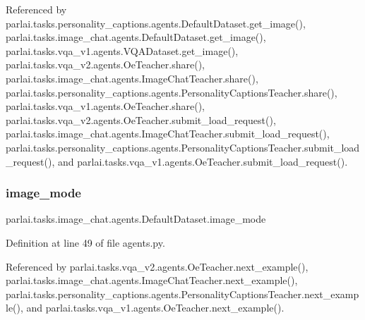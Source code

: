 Referenced by parlai.\+tasks.\+personality\+\_\+captions.\+agents.\+Default\+Dataset.\+get\+\_\+image(), parlai.\+tasks.\+image\+\_\+chat.\+agents.\+Default\+Dataset.\+get\+\_\+image(), parlai.\+tasks.\+vqa\+\_\+v1.\+agents.\+V\+Q\+A\+Dataset.\+get\+\_\+image(), parlai.\+tasks.\+vqa\+\_\+v2.\+agents.\+Oe\+Teacher.\+share(), parlai.\+tasks.\+image\+\_\+chat.\+agents.\+Image\+Chat\+Teacher.\+share(), parlai.\+tasks.\+personality\+\_\+captions.\+agents.\+Personality\+Captions\+Teacher.\+share(), parlai.\+tasks.\+vqa\+\_\+v1.\+agents.\+Oe\+Teacher.\+share(), parlai.\+tasks.\+vqa\+\_\+v2.\+agents.\+Oe\+Teacher.\+submit\+\_\+load\+\_\+request(), parlai.\+tasks.\+image\+\_\+chat.\+agents.\+Image\+Chat\+Teacher.\+submit\+\_\+load\+\_\+request(), parlai.\+tasks.\+personality\+\_\+captions.\+agents.\+Personality\+Captions\+Teacher.\+submit\+\_\+load\+\_\+request(), and parlai.\+tasks.\+vqa\+\_\+v1.\+agents.\+Oe\+Teacher.\+submit\+\_\+load\+\_\+request().

\mbox{\label{classparlai_1_1tasks_1_1image__chat_1_1agents_1_1DefaultDataset_ae429b8f3c79618de545845c21e098e63}} 
\subsubsection{\texorpdfstring{image\+\_\+mode}{image\_mode}}
{\footnotesize\ttfamily parlai.\+tasks.\+image\+\_\+chat.\+agents.\+Default\+Dataset.\+image\+\_\+mode}



Definition at line 49 of file agents.\+py.



Referenced by parlai.\+tasks.\+vqa\+\_\+v2.\+agents.\+Oe\+Teacher.\+next\+\_\+example(), parlai.\+tasks.\+image\+\_\+chat.\+agents.\+Image\+Chat\+Teacher.\+next\+\_\+example(), parlai.\+tasks.\+personality\+\_\+captions.\+agents.\+Personality\+Captions\+Teacher.\+next\+\_\+example(), and parlai.\+tasks.\+vqa\+\_\+v1.\+agents.\+Oe\+Teacher.\+next\+\_\+example().

\mbox{\label{classparlai_1_1tasks_1_1image__chat_1_1agents_1_1DefaultDataset_aedd4071dfb52d895e871da214dddb025}} 
